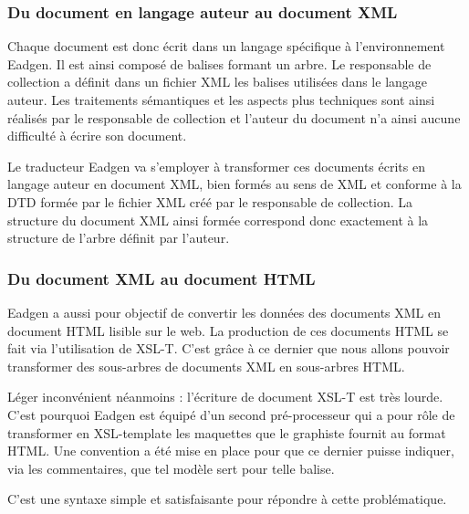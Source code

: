 \subsubsection{Du document en langage auteur au document XML}

Chaque document est donc écrit dans
un langage spécifique à l'environnement Eadgen. Il est ainsi
composé de balises formant un arbre. Le responsable de collection
a définit dans un fichier XML les balises utilisées
dans le langage auteur. Les traitements sémantiques et les aspects
plus techniques sont ainsi réalisés par le responsable de collection
et l'auteur du document n'a ainsi aucune difficulté à écrire son
document.

Le traducteur Eadgen va s'employer à transformer ces documents
écrits en langage auteur en document XML, bien formés au sens de
XML et conforme à la DTD formée par le fichier XML créé par le responsable
de collection. La structure du document XML ainsi formée correspond
donc exactement à la structure de l'arbre définit par l'auteur.

\subsubsection{Du document XML au document HTML}

Eadgen a aussi pour objectif de convertir les données des documents
XML en document HTML lisible sur le web. La production de
ces documents HTML se fait via l'utilisation de XSL-T. C'est grâce à
ce dernier que nous allons pouvoir transformer des sous-arbres de documents
XML en sous-arbres HTML.

Léger inconvénient néanmoins : l'écriture de document XSL-T est très lourde.
C'est pourquoi Eadgen est équipé d'un second pré-processeur qui a pour rôle
de transformer en XSL-template les maquettes que le graphiste fournit au
format HTML. Une convention a été mise en place pour que ce dernier puisse
indiquer, via les commentaires, que tel modèle sert pour telle balise.

C'est une syntaxe simple et satisfaisante pour répondre à cette problématique.
